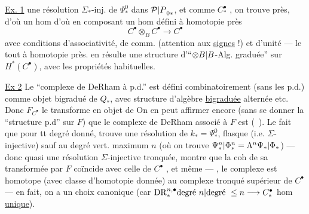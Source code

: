 \uline{Ex. 1}   une résolution $\Sigma_*$-inj. de $\Psi_*^0$ dans ${\mathcal P|P}_{0*}$, et comme $C_*^\bullet$ , on trouve
près, d'où un hom
d'où en composant un hom défini à homotopie près
\[
C^\bullet\otimes_B C^\bullet\longrightarrow C^\bullet
\]
avec conditions d'associativité, de comm. (attention aux \uline{signes} !) et d'unité --- le tout à homotopie près.  en résulte une structure d'``${\otimes B|B}$-Alg. graduée'' sur $H^*(C^\bullet)$, avec les propriétés habituelles.

\uline{Ex 2} Le ``complexe de DeRham à p.d.'' est défini combinatoirement (sans  les p.d.) comme objet bigradué de  $Q_*$, avec structure d'algèbre \uline{bigraduée} alternée etc. Donc $F_{C^\bullet}$ le transforme en objet de  On en peut affirmer encore (sans se donner la ``structure p.d'' sur $F$) que le complexe de DeRham associé à $F$ est  (\ ). Le fait que  pour tt degré  donné,  trouve une résolution de $k_*=\Psi_*^0$, flasque (i.e. $\Sigma$-injective) sauf au degré vert. maximum $n$ (où on trouve ${\Psi_*^n|\Phi_*^n}=\Lambda^n{\Psi_*|\Phi_*}$) --- donc quasi une résolution $\Sigma$-injective tronquée, montre que la coh de sa transformée par $F$ coïncide avec celle de $C^\bullet$  , et même --- , le complexe est homotope (avec classe d'homotopie donnée) au complexe tronqué supérieur de $C^\bullet$ --- en fait, on a un choix canonique (car ${\operatorname{DR}_*^{n,\bullet}}{\text{degré }n|\text{degré }\le n}\longrightarrow C_*^\bullet$ hom \uline{unique}).

